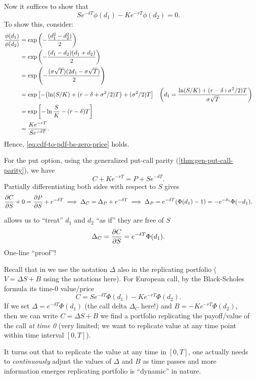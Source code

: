 \begin{enumerate}
\begin{pf}
Now it suffices to show that \begin{equation}
\label{eq:cdf-to-pdf-bs-zero-price}
Se^{-\delta T}\phi(d_1)-Ke^{-rT}\phi(d_2)=0.
\end{equation}
To show this, consider:
\begin{align*}
\frac{\phi(d_1)}{\phi(d_2)}&=\exp\qty(-\frac{(d_1^2-d_2^2)}{2})\\
&=\exp\qty(-\frac{(d_1-d_2)(d_1+d_2)}{2})\\
&=\exp\qty(-\frac{(\sigma\sqrt{T})(2d_1-\sigma\sqrt{T})}{2})\\
&=\exp\qty[-\qty(\ln(S/K)+(r-\delta+\sigma^2/2)T)+(\sigma^{2}/2)T]&
\qty(d_1=\frac{\ln(S/K)+(r-\delta{\color{violet}+}\sigma^2/2)T}{\sigma\sqrt{T}}) \\
&=\exp\qty[-\ln\frac{S}{K}-(r-\delta)T] \\
&=\frac{Ke^{-rT}}{Se^{-\delta T}}.
\end{align*}
Hence, \cref{eq:cdf-to-pdf-bs-zero-price} holds.

For the put option, using the generalized put-call parity
(\cref{thm:gen-put-call-parity}), we have
\[
C+Ke^{-rT}=P+Se^{-\delta T}.
\]
Partially differentiating both sides with respect to \(S\) gives
\[
\pdv{C}{S}+0=\pdv{P}{S}+e^{-\delta T}
\implies \Delta_C=\Delta_P+e^{-\delta T}
\implies \Delta_P=e^{-\delta T}(\Phi(d_1)-1)=-e^{-\delta_1}\Phi(-d_1).
\]
\end{pf}

\begin{mnemonic}
 allows us to ``treat'' \(d_1\) and
\(d_2\) ``as if'' they are free of \(S\) 
\[
\Delta_C=\pdv{C}{S}=e^{-\delta T}\Phi(d_1).
\]
One-line ``proof''!
\end{mnemonic}

\begin{note}
Recall that in  we use the notation \(\Delta\) also in
the replicating portfolio (\(V=\Delta S+B\) using the notations here).
For European call, by the Black-Scholes formula its time-0 value/price
\[
C=Se^{-\delta T}\Phi(d_1)-Ke^{-rT}\Phi(d_2).
\]
If we set \(\Delta=e^{-\delta T}\Phi(d_1)\) (the call delta \(\Delta_C\) here!)
and \(B=-Ke^{-rT}\Phi(d_2)\), then we can write \(C=\Delta S+B\)
 we find a portfolio replicating the payoff/value of the
call \emph{at time 0} (very limited; we want to replicate value at any time
point within time interval \([0,T]\)).

It turns out that to replicate the value at any time in \([0,T]\), one actually
needs to \emph{continuously} adjust the values of \(\Delta\) and \(B\) as time
passes and more information emerges  replicating portfolio
is ``dynamic'' in nature.
\end{note}


\end{enumerate}
